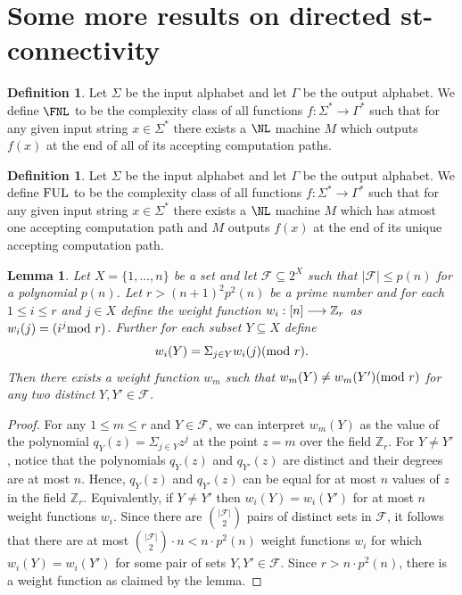 \documentclass{amsbook}
\newtheorem{lemma}[theorem]{Lemma}
\theoremstyle{definition}
\newtheorem{definition}[theorem]{Definition}
\theoremstyle{remark}
\numberwithin{section}{chapter}
\numberwithin{equation}{chapter}
\renewcommand{\mod}{\mbox{\textrm mod~}}
\newcommand{\Z}{\mathbb{Z}}
\newcommand{\F}{\mathcal{F}}
\newcommand{\FUL}{\mbox{\rm FUL}}
\begin{document}
\section{Some more results on directed st-connectivity}
\begin{definition}\label{fnldefn}
Let $\Sigma$ be the input alphabet and let $\Gamma$ be the output alphabet. We define $\FNL$ to be the complexity class of all functions $f:\Sigma^*\rightarrow\Gamma^*$ such that for any given input string $x\in\Sigma^*$ there exists a $\NL$ machine $M$ which outputs $f(x)$ at the end of all of its accepting computation paths.
\end{definition}
\begin{definition}\label{fuldefn}
Let $\Sigma$ be the input alphabet and let $\Gamma$ be the output alphabet. We define $\FUL$ to be the complexity class of all functions $f:\Sigma^*\rightarrow\Gamma^*$ such that for any given input string $x\in\Sigma^*$ there exists a $\NL$ machine $M$ which has atmost one accepting computation path and $M$ outputs $f(x)$ at the end of its unique accepting computation path.
\end{definition}

\begin{lemma}\label{polynomialweightlemma}
Let $X=\{ 1,\ldots ,n\}$ be a set and let $\F\subseteq 2^X$ such that $|\F |\leq p(n)$ for a polynomial $p(n)$. Let $r>(n+1)^2p^2(n)$ be a prime number and for each $1\leq i\leq r$ and $j\in X$ define the weight function $w_i:{\rm [}n{\rm ]}\longrightarrow \Z _r$ as $w_i(j)=(i^j \mod r)$. Further for each subset $Y\subseteq X$ define
\[
w_i(Y)=\Sigma_{j\in Y}w_i(j)(\mod r).
\]
Then there exists a weight function $w_m$ such that $w_m(Y)\neq w_m(Y')(\mod r)$ for any two distinct $Y,Y'\in \F$.
\end{lemma}
\begin{proof}
For any $1\leq m\leq r$ and $Y\in \F$, we can interpret $w_m(Y)$ as the value of the polynomial $q_Y(z)=\Sigma _{j\in Y}z^j$ at the point $z=m$ over the field $\Z _r$. For $Y\neq Y'$, notice that the polynomials $q_Y(z)$ and $q_{Y'}(z)$ are distinct and their degrees are at most $n$. Hence, $q_Y(z)$ and $q_{Y'}(z)$ can be equal for at most $n$ values of $z$ in the field $\Z _r$. Equivalently, if $Y\neq Y'$ then $w_i(Y)=w_i(Y')$ for at most $n$ weight functions $w_i$. Since there are ${|\F |}\choose{2}$ pairs of distinct sets in $\F$, it follows that there are at most ${{|\F |}\choose{2}}\cdot n<n\cdot p^2(n)$ weight functions $w_i$ for which $w_i(Y)=w_i(Y')$ for some pair of sets $Y,Y'\in \F$. Since $r>n\cdot p^2(n)$, there is a weight function as claimed by the lemma.
\end{proof}
\end{document}
